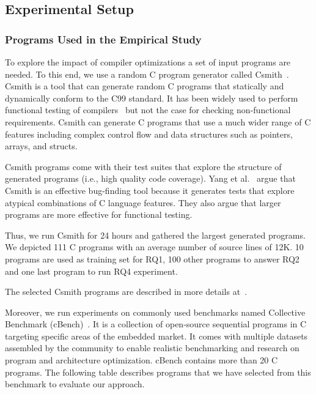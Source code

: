 \subsection{Experimental Setup}
\subsubsection{Programs Used in the Empirical Study}
To explore the impact of compiler optimizations a set of input programs are needed. 
To this end, we use a random C program generator called Csmith~\cite{yang2011finding}.
Csmith is a tool that can generate random C programs that statically and dynamically conform to the C99 standard. It has been widely used to perform functional testing of compilers~\cite{chen2016empirical,le2014compiler,nagai2013scaling} but not the case for checking non-functional requirements. Csmith can generate C programs that use a much wider range of C features including complex control flow and data structures such as pointers, arrays, and structs. 

Csmith programs come with their test suites that explore the structure of generated programs (i.e., high quality code coverage).
Yang et al.~\cite{yang2011finding} argue that Csmith is an effective bug-finding tool because it generates tests that explore atypical combinations of C language features. They also argue that larger programs are more effective for functional testing. 

Thus, we run Csmith for 24 hours and gathered the largest generated programs. We depicted 111 C programs with an average number of source lines of 12K. 10 programs are used as training set for RQ1, 100 other programs to answer RQ2 and one last program to run RQ4 experiment.

The selected Csmith programs are described in more details at~\cite{mboussaa}.



Moreover, we run experiments on commonly used benchmarks named Collective Benchmark (cBench)~\cite{fursin2009collective}. It is a collection of open-source sequential programs in C targeting specific areas of the embedded market. It comes with multiple datasets assembled by the community to enable realistic benchmarking and research on program and architecture optimization. cBench contains more than 20 C programs. The following table describes programs that we have selected from this benchmark to evaluate our approach.

